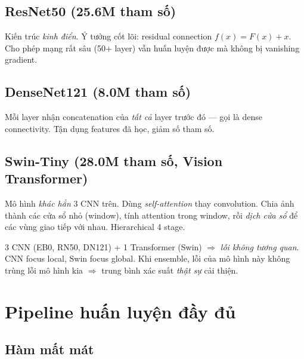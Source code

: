 \documentclass[11pt,a4paper]{article}
\begin{document}
\subsection{ResNet50 (25.6M tham số)}

\begin{simple}
Kiến trúc \textit{kinh điển}. Ý tưởng cốt lõi: residual connection $f(x) = F(x) + x$. Cho phép mạng rất sâu (50+ layer) vẫn huấn luyện được mà không bị vanishing gradient.
\end{simple}

\subsection{DenseNet121 (8.0M tham số)}

\begin{simple}
Mỗi layer nhận concatenation của \textit{tất cả} layer trước đó --- gọi là dense connectivity. Tận dụng features đã học, giảm số tham số.
\end{simple}

\subsection{Swin-Tiny (28.0M tham số, Vision Transformer)}

\begin{simple}
Mô hình \textit{khác hẳn} 3 CNN trên. Dùng \textit{self-attention} thay convolution. Chia ảnh thành các cửa sổ nhỏ (window), tính attention trong window, rồi \textit{dịch cửa sổ} để các vùng giao tiếp với nhau. Hierarchical 4 stage.
\end{simple}

\begin{idea}
3 CNN (EB0, RN50, DN121) + 1 Transformer (Swin) $\Rightarrow$ \textit{lỗi không tương quan}. CNN focus local, Swin focus global. Khi ensemble, lỗi của mô hình này không trùng lỗi mô hình kia $\Rightarrow$ trung bình xác suất \textit{thật sự} cải thiện.
\end{idea}

\section{Pipeline huấn luyện đầy đủ}

\subsection{Hàm mất mát}
\end{document}

